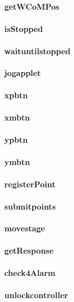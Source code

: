 \subsubsection{getWCoMPos}

\subsubsection{isStopped}

\subsubsection{waituntilstopped}

\subsubsection{jogapplet}

\subsubsection{xpbtn}

\subsubsection{xmbtn}

\subsubsection{ypbtn}

\subsubsection{ymbtn}

\subsubsection{registerPoint}

\subsubsection{submitpoints}

\subsubsection{movestage}

\subsubsection{getResponse}

\subsubsection{check4Alarm}

\subsubsection{unlockcontroller}
